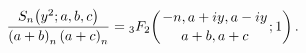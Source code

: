 \[\frac{\mathop{S_{n}\/}\nolimits\!\left(y^{2};a,b,c\right)}{\left(a+b\right)_{n%
}\left(a+c\right)_{n}}=\mathop{{{}_{3}F_{2}}\/}\nolimits\!\left({-n,a+iy,a-iy%
\atop a+b,a+c};1\right).\]